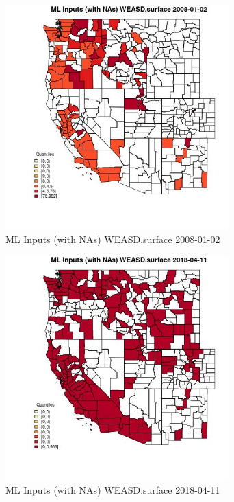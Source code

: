 \begin{figure} 
\centering  
\includegraphics[width=0.77\textwidth]{Code_Outputs/Report_ML_input_PM25_Step4_part_e_de_duplicated_aves_compiled_2019-05-18wNAs_CountyWEASDsurfaceMean2008-01-02_2008-01-02.jpg} 
\caption{\label{fig:Report_ML_input_PM25_Step4_part_e_de_duplicated_aves_compiled_2019-05-18wNAsCountyWEASDsurfaceMean2008-01-02_2008-01-02}ML Inputs (with NAs) WEASD.surface 2008-01-02} 
\end{figure} 
 

\begin{figure} 
\centering  
\includegraphics[width=0.77\textwidth]{Code_Outputs/Report_ML_input_PM25_Step4_part_e_de_duplicated_aves_compiled_2019-05-18wNAs_CountyWEASDsurfaceMean2018-04-11_2018-04-11.jpg} 
\caption{\label{fig:Report_ML_input_PM25_Step4_part_e_de_duplicated_aves_compiled_2019-05-18wNAsCountyWEASDsurfaceMean2018-04-11_2018-04-11}ML Inputs (with NAs) WEASD.surface 2018-04-11} 
\end{figure} 
 

